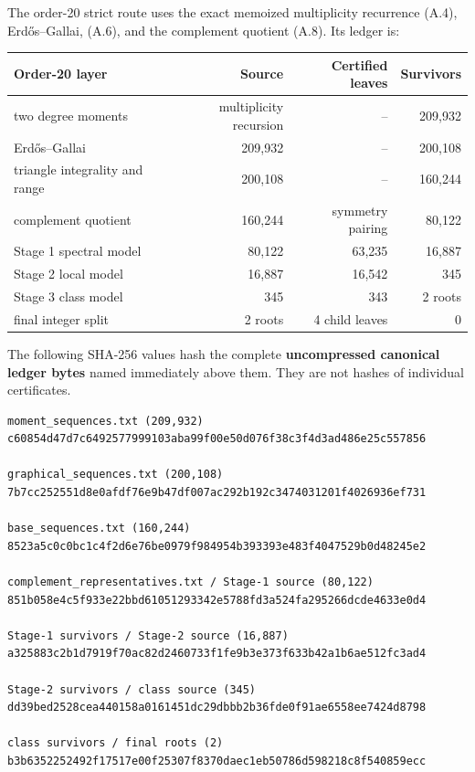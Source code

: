 \documentclass[
  english,
  11pt,
  a4paper,
]{article}
\newcounter{none} %
\begin{document}
The order-20 strict route uses the exact memoized multiplicity
recurrence (A.4), Erdős--Gallai, (A.6), and the complement quotient
(A.8). Its ledger is:

{\def\LTcaptype{none} %
\begin{longtable}[]{@{}lrrr@{}}
\toprule\noalign{}
Order-20 layer & Source & Certified leaves & Survivors \\
\midrule\noalign{}
\endhead
\bottomrule\noalign{}
\endlastfoot
two degree moments & multiplicity recursion & -- & 209,932 \\
Erdős--Gallai & 209,932 & -- & 200,108 \\
triangle integrality and range & 200,108 & -- & 160,244 \\
complement quotient & 160,244 & symmetry pairing & 80,122 \\
Stage 1 spectral model & 80,122 & 63,235 & 16,887 \\
Stage 2 local model & 16,887 & 16,542 & 345 \\
Stage 3 class model & 345 & 343 & 2 roots \\
final integer split & 2 roots & 4 child leaves & 0 \\
\end{longtable}
}

The following SHA-256 values hash the complete \textbf{uncompressed
canonical ledger bytes} named immediately above them. They are not
hashes of individual certificates.

\begin{verbatim}
moment_sequences.txt (209,932)
c60854d47d7c6492577999103aba99f00e50d076f38c3f4d3ad486e25c557856

graphical_sequences.txt (200,108)
7b7cc252551d8e0afdf76e9b47df007ac292b192c3474031201f4026936ef731

base_sequences.txt (160,244)
8523a5c0c0bc1c4f2d6e76be0979f984954b393393e483f4047529b0d48245e2

complement_representatives.txt / Stage-1 source (80,122)
851b058e4c5f933e22bbd61051293342e5788fd3a524fa295266dcde4633e0d4

Stage-1 survivors / Stage-2 source (16,887)
a325883c2b1d7919f70ac82d2460733f1fe9b3e373f633b42a1b6ae512fc3ad4

Stage-2 survivors / class source (345)
dd39bed2528cea440158a0161451dc29dbbb2b36fde0f91ae6558ee7424d8798

class survivors / final roots (2)
b3b6352252492f17517e00f25307f8370daec1eb50786d598218c8f540859ecc
\end{verbatim}
\end{document}
